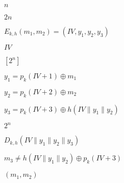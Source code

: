 \documentclass[10pt]{book}
\begin{document}
\begin{mdSnippets}
\begin{mdInlineSnippet}[7b8b965ad4bca0e41ab51de7b31363a1]%
$n$\end{mdInlineSnippet}%
\begin{mdInlineSnippet}[21e2c0c0472b331622877accbe29b91b]%
$2n$\end{mdInlineSnippet}%
\begin{mdInlineSnippet}[246f6c7162d36f8ec6beb143003399d9]%
$E_{k,h}(m_1,m_2) = (IV,y_1,y_2,y_3)$\end{mdInlineSnippet}%
\begin{mdInlineSnippet}[cf482c5807b62034beeabdb795c5a689]%
$IV$\end{mdInlineSnippet}%
\begin{mdInlineSnippet}[670871019e1f314005ef5e26af4be246]%
$[2^n]$\end{mdInlineSnippet}%
\begin{mdInlineSnippet}[02012976415a74833600c0a000086452]%
$y_1=p_k(IV+1)\oplus m_1$\end{mdInlineSnippet}%
\begin{mdInlineSnippet}[1d5de1f6bd14a9b545c6ea5c1ed32131]%
$y_2=p_k(IV+2) \oplus m_2$\end{mdInlineSnippet}%
\begin{mdInlineSnippet}%
$y_3=p_k(IV+3)\oplus h(IV\|y_1\|y_2)$\end{mdInlineSnippet}%
\begin{mdInlineSnippet}[d1db0d9c696a8c056e7117dbbb4ef6db]%
$2^n$\end{mdInlineSnippet}%
\begin{mdInlineSnippet}[900542f31cfb59ee90dd31c65f404237]%
$D_{k,h}(IV\|y_1\|y_2\|y_3)$\end{mdInlineSnippet}%
\begin{mdInlineSnippet}[2e1fc10a50e13600f8fde621316917df]%
$m_3 \neq h(IV\|y_1\|y_2)\oplus p_k(IV+3)$\end{mdInlineSnippet}%
\begin{mdInlineSnippet}[e990fa131877446dc5936877fa696155]%
$(m_1,m_2)$\end{mdInlineSnippet}%

\end{mdSnippets}
\end{document}
